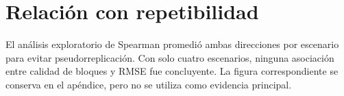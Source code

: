 \section{Relación con repetibilidad}
El análisis exploratorio de Spearman promedió ambas direcciones por escenario para evitar pseudorreplicación. Con solo cuatro escenarios, ninguna asociación entre calidad de bloques y RMSE fue concluyente. La figura correspondiente se conserva en el apéndice, pero no se utiliza como evidencia principal.

